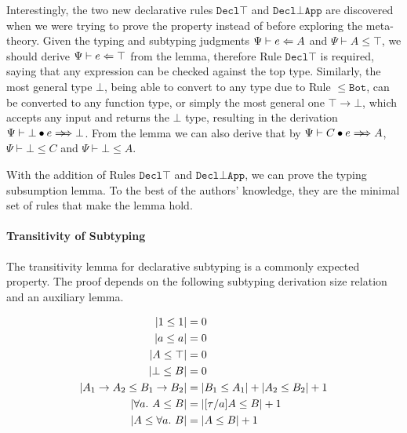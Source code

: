 Interestingly, the two new declarative rules
$\mathtt{Decl\top}$ and $\mathtt{Decl{\bot}App}$ are
discovered when we were trying to prove the property instead of
before exploring the meta-theory.
Given the typing and subtyping judgments $\Psi \vdash e \Leftarrow A$ and $\Psi \vdash A \le \top$,
we should derive $\Psi \vdash e \Leftarrow \top$ from the lemma,
therefore Rule $\mathtt{Decl\top}$ is required,
saying that any expression can be checked against the top type.
Similarly, the most general type $\bot$,
being able to convert to any type due to Rule $\mathtt{{\le}Bot}$,
can be converted to any function type,
or simply the most general one $\top \to \bot$,
which accepts any input and returns the $\bot$ type,
resulting in the derivation $\Psi \vdash \appInf{\bot}{e}{\bot}$.
From the lemma we can also derive that by
$\Psi \vdash \appInf{C}{e}{A}$, $\Psi \vdash \bot \le C$ and $\Psi \vdash \bot \le A$.

With the addition of Rules $\mathtt{Decl\top}$ and $\mathtt{Decl{\bot}App}$,
we can prove the typing subsumption lemma.
To the best of the authors' knowledge,
they are the minimal set of rules that make the lemma hold.


\paragraph{Transitivity of Subtyping}

The transitivity lemma for declarative subtyping is a commonly expected property.
The proof depends on the following subtyping derivation size relation and an auxiliary lemma.

\begin{definition}
    \begin{gather*}
        \begin{aligned}
            |1 \le 1| &= 0\\
            |a \le a| &= 0\\
            |A \le \top| &= 0\\
            |\bot \le B| &= 0\\
            |A_1 \to A_2 \le B_1 \to B_2| &= |B_1 \le A_1| + |A_2 \le B_2| + 1\\
            |\all A \le B| &= |[\tau/a]A \le B| + 1\\
            |A \le \all B| &= |A \le B| + 1
        \end{aligned}
    \end{gather*}
\end{definition}


